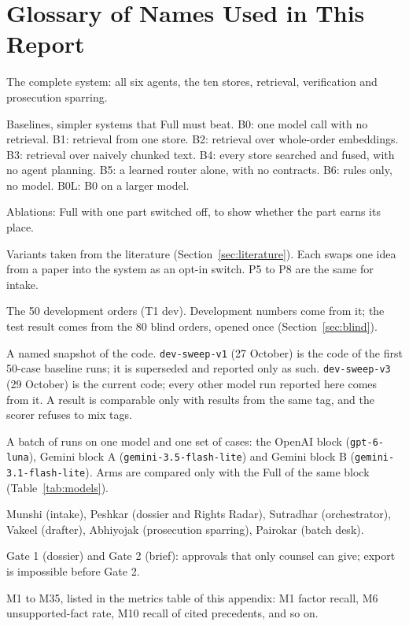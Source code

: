 \section{Glossary of Names Used in This Report}
\label{sec:glossary}

\begin{description}\itemsep0pt
\item[Full] The complete system: all six agents, the ten stores, retrieval, verification and prosecution sparring.
\item[B0 to B6] Baselines, simpler systems that Full must beat. B0: one model call with no retrieval. B1: retrieval from one store. B2: retrieval over whole-order embeddings. B3: retrieval over naively chunked text. B4: every store searched and fused, with no agent planning. B5: a learned router alone, with no contracts. B6: rules only, no model. B0L: B0 on a larger model.
\item[A1 to A10] Ablations: Full with one part switched off, to show whether the part earns its place.
\item[S1 to S18] Variants taken from the literature (Section~\ref{sec:literature}). Each swaps one idea from a paper into the system as an opt-in switch. P5 to P8 are the same for intake.
\item[Dev set] The 50 development orders (T1 dev). Development numbers come from it; the test result comes from the 80 blind orders, opened once (Section~\ref{sec:blind}).
\item[Code tag] A named snapshot of the code. \texttt{dev-sweep-v1} (27 October) is the code of the first 50-case baseline runs; it is superseded and reported only as such. \texttt{dev-sweep-v3} (29 October) is the current code; every other model run reported here comes from it. A result is comparable only with results from the same tag, and the scorer refuses to mix tags.
\item[Block] A batch of runs on one model and one set of cases: the OpenAI block (\texttt{gpt-6-luna}), Gemini block A (\texttt{gemini-3.5-flash-lite}) and Gemini block B (\texttt{gemini-3.1-flash-lite}). Arms are compared only with the Full of the same block (Table~\ref{tab:models}).
\item[Agents] Munshi (intake), Peshkar (dossier and Rights Radar), Sutradhar (orchestrator), Vakeel (drafter), Abhiyojak (prosecution sparring), Pairokar (batch desk).
\item[Gates] Gate 1 (dossier) and Gate 2 (brief): approvals that only counsel can give; export is impossible before Gate 2.
\item[Metrics] M1 to M35, listed in the metrics table of this appendix: M1 factor recall, M6 unsupported-fact rate, M10 recall of cited precedents, and so on.
\end{description}

